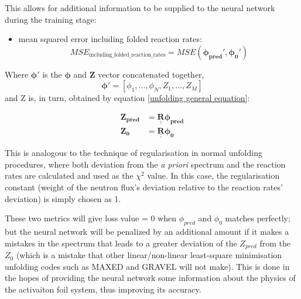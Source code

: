\documentclass[a4paper, 12pt]{article}
\newcommand{\matr}[1]{\underline{\underline{\textbf{#1}}}}
\newcommand{\ve}[1]{\boldsymbol{#1}}
\begin{document}
    This allows for additional information to be supplied to the neural network during the training stage:
        
    \begin{itemize}
        \item mean squared error including folded reaction rates:
        \begin{equation}\label{MSE_including_folded_reaction_rates}
            MSE_{\text{including\_folded\_reaction\_rates}}=MSE(\ve{\phi_{pred}'},\ve{\phi_{0}'})
        \end{equation}
    \end{itemize}
    Where $\ve{\phi'}$ is the $\ve{\phi}$ and $\ve{Z}$ vector concatenated together,
    \begin{equation}\label{NNregularisation}
        \ve{\phi'} = [\phi_1, ..., \phi_N, Z_1, ..., Z_M]
    \end{equation}
    and Z is, in turn, obtained by equation \ref{unfolding general equation}:

    \begin{align}\label{unfolding general equation prediction}
        \ve{Z_{pred}} &= \matr{R} \ve{\phi_{pred} }\\
        \ve{Z_{0}} &= \matr{R} \ve{\phi_{0} }
    \end{align}

    This is analogous to the technique of regularisation\cite{FisherRegularisation} in normal unfolding procedures, where both deviation from the \emph{a priori} spectrum and the reaction rates are calculated and used as the $\chi^2$ value. In this case, the regularisation constant (weight of the neutron flux's deviation relative to the reaction rates' deviation) is simply chosen as 1.

    These two metrics will give loss value = 0 when $\phi_{pred}$ and $\phi_0$ matches perfectly; but the neural network will be penalized by an additional amount if it makes a mistakes in the spectrum that leads to a greater deviation of the $Z_{pred}$ from the $Z_{0}$ (which is a mistake that other linear/non-linear least-square minimisation unfolding codes such as MAXED and GRAVEL will not make).
    This is done in the hopes of providing the neural network some information about the physics of the activaiton foil system, thus improving its accuracy.
\end{document}
